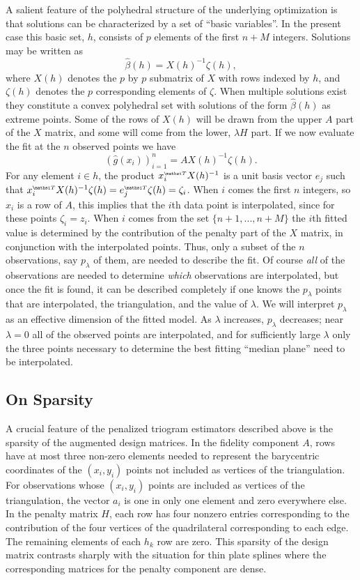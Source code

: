 A salient feature of the polyhedral structure of the underlying
optimization is that solutions can be characterized by a set of
``basic variables''. In the present case this basic set, $h$, consists
of $p$ elements of the first $n+M$ integers. Solutions may be written
as
\[
\hat \beta (h) = X(h)^{-1} \zeta (h),
\]
where $X(h)$ denotes the $p$ by $p$ submatrix of $X$ with rows indexed by $h$,
and $\zeta (h)$ denotes the $p$ corresponding elements of $\zeta$.
When multiple solutions exist they constitute a convex polyhedral set
with solutions of the form $\hat \beta (h)$ as extreme points.
Some of the rows of $X(h)$ will be drawn from the upper $A$ part of the
$X$ matrix, and some will come from the lower, $\lambda H$ part. If we
now evaluate the fit at the $n$ observed points we have
\[
(\hat g (x_i))_{i=1}^n = A X(h)^{-1}\zeta (h).
\]
For any element $i \in h$, the product $x_i \trans X(h)^{-1}$ is a
unit basis vector $e_j$ such that $x_i \trans X(h)^{-1} \zeta (h) =e_j
\trans \zeta (h) = \zeta_i$. When $i$ comes the first $n$ integers, so
$x_i$ is a row of $A$, this implies that the $i$th data point is
interpolated, since for these points $\zeta_i = z_i$. When $i$ comes
from the set $\{ n+1, ... , n+M\}$ the $i$th fitted value is
determined by the contribution of the penalty part of the $X$ matrix,
in conjunction with the interpolated points. Thus, only a subset of
the $n$ observations, say $p_\lambda$ of them, are needed to describe
the fit. Of course {\it all} of the observations are needed to
determine {\it which} observations are interpolated, but once the fit
is found, it can be described completely if one knows the $p_\lambda$
points that are interpolated, the triangulation, and the value of
$\lambda$. We will interpret $p_\lambda$ as an effective dimension of the
fitted model. As $\lambda$ increases, $p_\lambda$ decreases; near
$\lambda = 0$ all of the observed points are interpolated, and for
sufficiently large $\lambda$ only the three points necessary to determine
the best fitting ``median plane'' need to be interpolated.



\subsection{On Sparsity}

A crucial feature of the penalized triogram estimators described above
is the sparsity of the augmented design matrices.  In the fidelity 
component $A$, rows have at most three non-zero elements needed to
represent the barycentric coordinates of the $(x_i , y_i)$ points not
included as vertices of the triangulation.  
For observations whose $(x_i,y_i)$ points are included as vertices of
the triangulation, the vector $a_i$ is one
in only one element and zero everywhere else.  In the penalty matrix $H$, 
each row has four nonzero entries corresponding to the contribution of the
four vertices of the quadrilateral corresponding to each edge.
The remaining elements of each $h_k$ row are zero.
This sparsity of the  design matrix contrasts sharply with the situation for
thin plate splines where the corresponding matrices for the penalty
component are dense.

